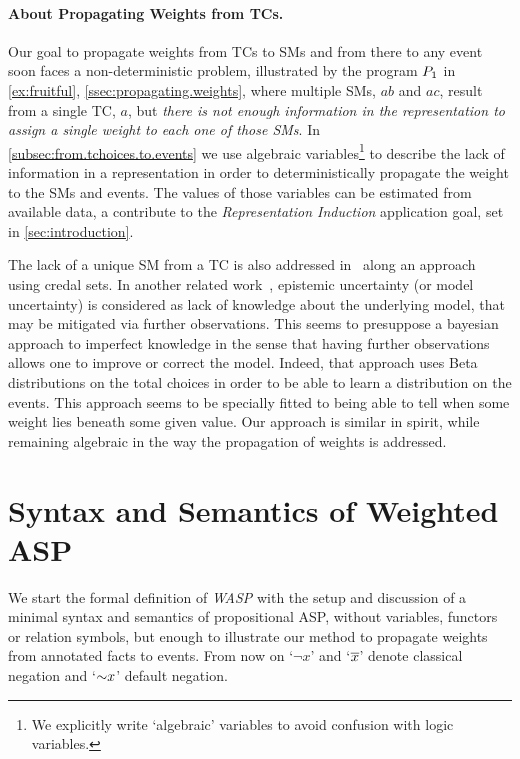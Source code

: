 \documentclass[x11names]{tlp}
\renewcommand{\cite}{\citep}
\begin{document}
\paragraph{About Propagating Weights from \Aclp{TC}.}%

Our goal to propagate weights from \acp{TC} to \acp{SM} and from there to any event soon faces a non-deterministic problem, illustrated by the program $P_{\mathrm{1}}$ in \cref{ex:fruitful}, \cref{ssec:propagating.weights}, where multiple \acp{SM}, $ab$ and $ac$, result from a single \ac{TC}, $a$, but \emph{there is not enough information in the representation to assign a single weight to each one of those \acp{SM}}.
In \cref{subsec:from.tchoices.to.events} we use algebraic variables\footnote{We explicitly write `algebraic' variables to avoid confusion with logic variables.} to describe the lack of information in a representation in order to deterministically propagate the weight to the \aclp{SM} and events.
The values of those variables can be estimated from available data, a contribute to the \emph{Representation Induction} application goal, set in \cref{sec:introduction}.

The lack of a unique \acl{SM} from a \acl{TC} is also addressed in~\cite{cozman2020joy} along an approach using credal sets.
In another related work~\cite{verreet2022inference}, epistemic uncertainty (or model uncertainty) is considered as lack of knowledge about the underlying model, that may be mitigated via further observations.
This seems to presuppose a bayesian approach to imperfect knowledge in the sense that having further observations allows one to improve or correct the model.
Indeed, that approach uses Beta distributions on the total choices in order to be able to learn a distribution on the events.
This approach seems to be specially fitted to being able to tell when some weight lies beneath some given value.
Our approach is similar in spirit, while remaining algebraic in the way the propagation of weights is addressed.

\section{Syntax and Semantics of Weighted ASP}
\label{sec:syntax.and.semantics}

We start the formal definition of \emph{\acl*{WASP}} with the setup and discussion of a minimal syntax and semantics of propositional \ac{ASP}, without variables, functors or relation symbols, but enough to illustrate our method to propagate weights from annotated facts to events. From now on `$\neg x$' and `$\overline{x}$' denote classical negation and `$\operatorname{\sim\!} x$' default negation.
\end{document}
